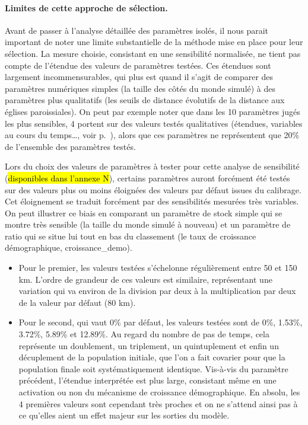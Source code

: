 \paragraph{Limites de cette approche de sélection.}
Avant de passer à l'analyse détaillée des paramètres isolés, il nous parait important de noter une limite substantielle de la méthode mise en place pour leur sélection.
La mesure choisie, consistant en une sensibilité normalisée, ne tient pas compte de l'étendue des valeurs de paramètres testées.
Ces étendues sont largement incommensurables, qui plus est quand il s'agit de comparer des paramètres numériques simples (la taille des côtés du monde simulé) à des paramètres plus qualitatifs (les seuils de distance évolutifs de la distance aux églises paroissiales).
On peut par exemple noter que dans les 10 paramètres jugés les plus sensibles, 4 portent sur des valeurs testés \og qualitatives\fg{} (étendues, variables au cours du temps\ldots, voir p.~\pageref{par:etendue-parametres}), alors que ces paramètres ne représentent que 20\% de l'ensemble des paramètres testés.

Lors du choix des valeurs de paramètres à tester pour cette analyse de sensibilité (\hl{disponibles dans l'annexe N}), certains paramètres auront forcément été testés sur des valeurs plus ou moins éloignées des valeurs par défaut issues du calibrage.
Cet éloignement se traduit forcément par des sensibilités mesurées très variables.
On peut illustrer ce biais en comparant un paramètre de stock simple qui se montre très sensible (la taille du monde simulé à nouveau) et un paramètre de ratio qui se situe lui tout en bas du classement (le taux de croissance démographique, \textsf{croissance\_demo}).
\begin{itemize}
	\item Pour le premier, les valeurs testées s'échelonne régulièrement entre 50 et 150 km.
	L'ordre de grandeur de ces valeurs est similaire, représentant une variation qui va environ de la division par deux à la multiplication par deux de la valeur par défaut (80 km).
	\item Pour le second, qui vaut 0\% par défaut, les valeurs testées sont de 0\%, 1.53\%, 3.72\%, 5.89\% et 12.89\%.
	Au regard du nombre de pas de temps, cela représente un doublement, un triplement, un quintuplement et enfin un décuplement de la population initiale, que l'on a fait covarier pour que la population finale soit systématiquement identique.
 	Vis-à-vis du paramètre précédent, l'étendue interprétée est plus large, consistant même en une activation ou non du mécanisme de croissance démographique.
 	En absolu, les 4 premières valeurs sont cependant très proches et on ne s'attend ainsi pas à ce qu'elles aient un effet majeur sur les sorties du modèle.	
\end{itemize}

